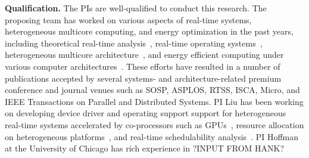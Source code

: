 \vspace{2mm} \noindent \textbf{Qualification.} The PIs are well-qualified to conduct this research. The proposing team has worked on various aspects of real-time systems, heterogeneous multicore computing, and energy optimization in the past years, including theoretical real-time analysis~\cite{Liu1, Liu2, Liu6, Liu7, Liu10, liu2014supporting,  Liu3, Liu4, Liu5, Liu9, Liu11, Liu13}, real-time operating systems~\cite{elliott1minimizing, Liu12, GPES, zhou2015supporting, Zhou2014a}, heterogeneous multicore architecture~\cite{Zhou2014a, GPES}, and energy efficient computing under various computer architectures~\cite{Liu12}. These efforts have resulted in a number of publications accepted by several systems- and architecture-related premium conference and journal venues such as SOSP, ASPLOS, RTSS, ISCA, Micro, and IEEE Transactions on Parallel and Distributed Systems. 
PI Liu has been working on developing device driver and operating support support for heterogeneous real-time systems accelerated by co-processors such as GPUs~\cite{Liu12, GPES, zhou2015supporting, Zhou2014a},  resource allocation on heterogeneous platforms~\cite{Tong14a, LiuRTSS14a, LiuRTSS15}, and real-time schedulability analysis~\cite{Liu1, Liu2, Liu6, Liu7, Liu10, liu2014supporting, LiuRTSS14b, elliott1minimizing, Liu3, Liu4, Liu5, Liu9, Liu11, Liu13}.
PI Hoffman at the University of Chicago has rich experience in ?INPUT FROM HANK?